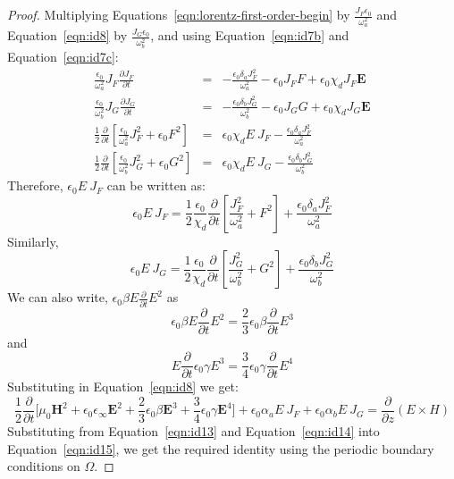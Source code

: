 \documentclass{article}[12pt]
\theoremstyle{plain}
\begin{document}
\begin{proof}
Multiplying Equations~\ref{eqn:lorentz-first-order-begin} by $\frac{J_F\epsilon_0}{\omega^2_a}$ and Equation~\ref{eqn:id8} by
$\frac{J_G\epsilon_0}{\omega^2_b}$, and using Equation~\ref{eqn:id7b} and Equation~\ref{eqn:id7c}:
\begin{eqnarray}
\frac{\epsilon_0}{\omega^2_a} J_F \frac{\partial J_F}{\partial t} & = &
-\frac{\epsilon_0\delta_a J_F^2}{\omega^2_a} - \epsilon_0 J_F F + \epsilon_0 \chi_d J_F \mathbf{E} \label{eqn:id9}\\
\frac{\epsilon_0}{\omega^2_b} J_G \frac{\partial J_G}{\partial t} & = &
-\frac{\epsilon_0\delta_b J_G^2}{\omega^2_b} - \epsilon_0 J_G G + \epsilon_0 \chi_d J_G \mathbf{E} \label{eqn:id10}\\
\frac{1}{2} \frac{\partial}{\partial t}[\frac{\epsilon_0}{\omega^2_a} J_F^2 + \epsilon_0 F^2] & = & \epsilon_0 \chi_d E\ J_F - \frac{\epsilon_0\delta_a J_F^2}{\omega^2_a} \label{eqn:id11} \\
\frac{1}{2} \frac{\partial}{\partial t}[\frac{\epsilon_0}{\omega^2_b} J_G^2 + \epsilon_0 G^2] & = & \epsilon_0 \chi_d E\ J_G - \frac{\epsilon_0\delta_b J_G^2}{\omega^2_b} \label{eqn:id12} 
\end{eqnarray}
Therefore, $\epsilon_0 E\ J_F$ can be written as:
\begin{equation}
\epsilon_0 E\ J_F = \frac{1}{2} \frac{\epsilon_0}{\chi_d} \frac{\partial}{\partial t}[\frac{J_F^2}{\omega^2_a}  + F^2] + \frac{\epsilon_0\delta_a J_F^2}{\omega^2_a} \label{eqn:id13} 
\end{equation}
Similarly,
\begin{equation}
\epsilon_0 E\ J_G = \frac{1}{2} \frac{\epsilon_0}{\chi_d} \frac{\partial}{\partial t}[\frac{J_G^2}{\omega^2_b}  + G^2] + \frac{\epsilon_0\delta_b J_G^2}{\omega^2_b} \label{eqn:id14} 
\end{equation}
We can also write, $\epsilon_0 \beta E \frac{\partial}{\partial t}E^2$ as
\[
\epsilon_0 \beta E \frac{\partial}{\partial t}E^2 = \frac{2}{3} \epsilon_0 \beta \frac{\partial }{\partial t} E^3
\]
and
\[
E \frac{\partial}{\partial t} \epsilon_0 \gamma E^3 = \frac{3}{4} \epsilon_0 \gamma \frac{\partial}{\partial t}E^4
\]
Substituting in Equation~\ref{eqn:id8} we get:
\begin{equation}
\frac{1}{2} \frac{\partial}{\partial t}\Big[\mu_0\mathbf{H}^2 + \epsilon_0\epsilon_\infty \mathbf{E}^2 
+\frac{2}{3}\epsilon_0\beta \mathbf{E}^3
+\frac{3}{4}\epsilon_0\gamma \mathbf{E}^4
\Big] + \epsilon_0\alpha_a E\ J_F + \epsilon_0\alpha_b E\ J_G = \frac{\partial}{\partial z}(E\times H)\label{eqn:id15}
\end{equation}
Substituting from Equation~\ref{eqn:id13} and Equation~\ref{eqn:id14} into Equation~\ref{eqn:id15}, we get
the required identity using the periodic boundary conditions on $\Omega$.
\end{proof}
\end{document}
